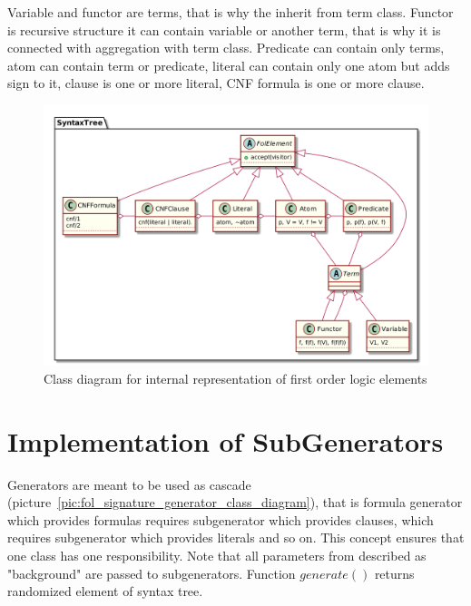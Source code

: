 Variable and functor are terms, that is why the inherit from term class. Functor is recursive structure it can contain variable or another term, that is why it is connected with aggregation with term class. Predicate can contain only terms, atom can contain term or predicate, literal can contain only one atom but adds sign to it, clause is one or more literal, CNF formula is one or more clause.

\begin{figure}[h]
\begin{centering}
  \includegraphics[width=\textwidth]{logic-formula-generator/fol/cnf_fol_elements.png}
  \caption{Class diagram for internal representation of first order logic elements}
  \label{pic:fol_elements_class_diagram}
\end{centering}
\end{figure}

\section{Implementation of SubGenerators}
\label{sec:SubGenerators}

Generators are meant to be used as cascade (picture~\ref{pic:fol_signature_generator_class_diagram}), that is formula generator which provides formulas requires subgenerator which provides clauses, which requires subgenerator which provides literals and so on. This concept ensures that one class has one responsibility. Note that all parameters from described as "background" are passed to subgenerators. Function $generate()$ returns randomized element of syntax tree. 

